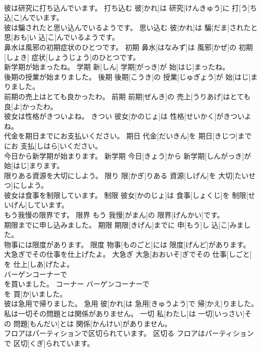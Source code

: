 \documentclass[8pt]{extreport}
\begin{document}
\begin{CJK}{UTF8}{min}
\\	彼は研究に打ち込んでいます。	打ち込む	彼[かれ]は 研究[けんきゅう]に 打[う]ち 込[こ]んでいます。	
\\	彼は騙されたと思い込んでいるようです。	思い込む	彼[かれ]は 騙[だま]されたと 思[おも]い 込[こ]んでいるようです。	
\\	鼻水は風邪の初期症状のひとつです。	初期	鼻水[はなみず]は 風邪[かぜ]の 初期[しょき] 症状[しょうじょう]のひとつです。	
\\	新学期が始まったね。	学期	新[しん] 学期[がっき]が 始[はじ]まったね。	
\\	後期の授業が始まりました。	後期	後期[こうき]の 授業[じゅぎょう]が 始[はじ]まりました。	
\\	前期の売上はとても良かったわ。	前期	前期[ぜんき]の 売上[うりあげ]はとても 良[よ]かったわ。	
\\	彼女は性格がきついよね。	きつい	彼女[かのじょ]は 性格[せいかく]がきついよね。	
\\	代金を期日までにお支払いください。	期日	代金[だいきん]を 期日[きじつ]までにお 支払[しはら]いください。	
\\	今日から新学期が始まります。	新学期	今日[きょう]から 新学期[しんがっき]が 始[はじ]まります。	
\\	限りある資源を大切にしよう。	限り	限[かぎ]りある 資源[しげん]を 大切[たいせつ]にしよう。	
\\	彼女は食事を制限しています。	制限	彼女[かのじょ]は 食事[しょくじ]を 制限[せいげん]しています。	
\\	もう我慢の限界です。	限界	もう 我慢[がまん]の 限界[げんかい]です。	
\\	期限までに申し込みました。	期限	期限[きげん]までに 申[もう]し 込[こ]みました。	
\\	物事には限度があります。	限度	物事[ものごと]には 限度[げんど]があります。	
\\	大急ぎでその仕事を仕上げたよ。	大急ぎ	大急[おおいそ]ぎでその 仕事[しごと]を 仕上[しあ]げたよ。	
\\	バーゲンコーナーで
\\	を買いました。	コーナー	バーゲンコーナーで 
\\	[でぃーぶいでぃー]を 買[か]いました。	
\\	彼は急用で帰りました。	急用	彼[かれ]は 急用[きゅうよう]で 帰[かえ]りました。	
\\	私は一切その問題とは関係がありません。	一切	私[わたし]は 一切[いっさい]その 問題[もんだい]とは 関係[かんけい]がありません。	
\\	フロアはパーティションで区切られています。	区切る	フロアはパーティションで 区切[くぎ]られています。	

\end{CJK}
\end{document}
